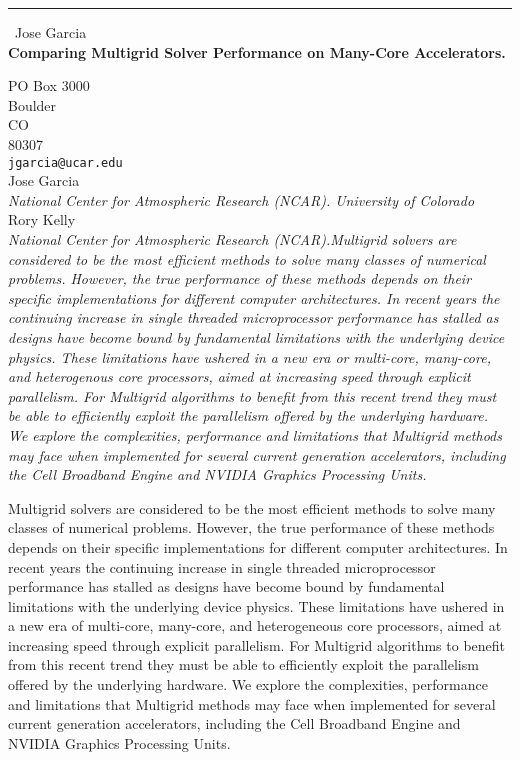 \documentclass{report}
\begin{document}
\begin{center}
\rule{6in}{1pt} \
{\large Jose Garcia \\
{\bf Comparing Multigrid Solver Performance on Many-Core Accelerators.}}

PO Box 3000 \\ Boulder \\ CO \\ 80307
\\
{\tt jgarcia@ucar.edu}\\
Jose Garcia\\
{\em National Center for Atmospheric Research (NCAR).
University of Colorado}\\
Rory Kelly\\
{\em National Center for Atmospheric Research (NCAR).Multigrid solvers are considered to be the most efficient methods to solve
many classes of numerical problems.  However, the true performance of these
methods depends on their specific implementations for different
computer architectures.  In recent years the continuing increase in single
threaded microprocessor performance has stalled as designs have become
bound by fundamental limitations with the underlying device physics.  These
limitations have ushered in a new era or multi-core, many-core, and heterogenous
core processors, aimed at increasing speed through explicit parallelism. For
Multigrid algorithms to benefit from this recent trend they must be able to
efficiently exploit the parallelism offered by the underlying hardware. We explore
the complexities, performance and limitations that Multigrid methods may face
when implemented for several current generation accelerators, including the
Cell Broadband Engine and NVIDIA Graphics Processing Units.}\end{center}

Multigrid solvers are considered to be the most efficient methods to
solve many classes of numerical problems. However, the true performance
of these methods depends on their specific implementations for different
computer architectures. In recent years the continuing increase in single
threaded microprocessor performance has stalled as designs have become
bound by fundamental limitations with the underlying device physics.
These
limitations have ushered in a new era of multi-core, many-core, and
heterogeneous core processors, aimed at increasing speed through explicit
parallelism. For Multigrid algorithms to benefit from this recent trend
they must be able to efficiently exploit the parallelism offered by the
underlying hardware. We explore
the complexities, performance and limitations that Multigrid methods may
face when implemented for several current generation accelerators,
including the Cell Broadband Engine and NVIDIA Graphics Processing Units.
\end{document}
